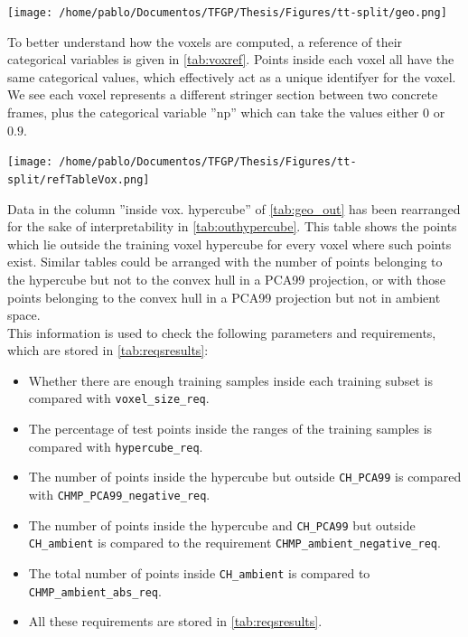%
\begin{table}[htbp]
	\centering
	\label{tab:geo_out}
	\begin{minipage}{1\textwidth}
		\centering
		\texttt{[image: /home/pablo/Documentos/TFGP/Thesis/Figures/tt-split/geo.png]}
	\end{minipage}
\end{table}
%
\indent To better understand how the voxels are computed, a reference of their categorical variables is given in \autoref{tab:voxref}. Points inside each voxel all have the same categorical values, which effectively act as a unique identifyer for the voxel. We see each voxel represents a different stringer section between two concrete frames, plus the categorical variable ''np'' which can take the values either $0$ or $0.9$.\\
%
\begin{table}[!htb]
	\centering
	\label{tab:voxref}
	\texttt{[image: /home/pablo/Documentos/TFGP/Thesis/Figures/tt-split/refTableVox.png]}
\end{table}
%
\indent Data in the column ''inside vox. hypercube'' of \autoref{tab:geo_out} has been rearranged for the sake of interpretability in \autoref{tab:outhypercube}. This table shows the points which lie outside the training voxel hypercube for every voxel where such points exist. Similar tables could be arranged with the number of points belonging to the hypercube but not to the convex hull in a PCA99 projection, or with those points belonging to the convex hull in a PCA99 projection but not in ambient space.\\
%
\indent This information is used to check the following parameters and requirements, which are stored in \autoref{tab:reqsresults}:
%
\begin{itemize}
	\item Whether there are enough training samples inside each training subset is compared with \texttt{voxel\_size\_req}.
	\item The percentage of test points inside the ranges of the training samples is compared with \texttt{hypercube\_req}.
	\item The number of points inside the hypercube but outside \texttt{CH\_PCA99} is compared with \texttt{CHMP\_PCA99\_negative\_req}.
	\item The number of points inside the hypercube and \texttt{CH\_PCA99} but outside \texttt{CH\_ambient} is compared to the requirement \texttt{CHMP\_ambient\_negative\_req}.
	\item The total number of points inside \texttt{CH\_ambient} is compared to \texttt{CHMP\_ambient\_abs\_req}.
	\item All these requirements are stored in \autoref{tab:reqsresults}.
\end{itemize}

